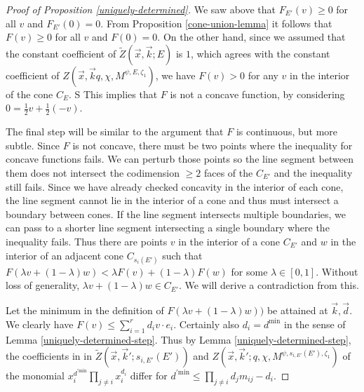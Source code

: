 \documentclass[11pt,letterpaper]{article}
\theoremstyle{definition}
\theoremstyle{remark}
\numberwithin{equation}{section}
\theoremstyle{dotless}
\newcommand{\hchi}{\psi} %
\newcommand{\gene}{\zeta_1} %
\renewcommand{\tilde}{\widetilde}
\begin{document}
\begin{proof}[Proof of Proposition \ref{uniquely-determined}]

We saw above that $F_{E'}(v)\geq 0$ for all $v$ and $F_{E'}(0)=0$.  From Proposition \ref{cone-union-lemma} it follows that $F(v) \geq 0$ for all $v$ and $F(0)=0$. On the other hand, since we assumed that the constant coefficient of $\tilde{Z} (\vec{x},\vec{k}; E)$ is $1$, which agrees with the constant coefficient of  $Z(\vec{x}, \vec{k} q, \chi, M^{\hchi,E,\gene}) $, we have $F(v)>0$ for any $v$ in the interior of the cone $C_{E}$. S This implies that $F$ is not a concave function, by considering $0 = \frac{1}{2} v+ \frac{1}{2} (-v)$. 

The final step will be similar to the argument that $F$ is continuous, but more subtle. Since $F$ is not concave, there must be two points where the inequality for concave functions fails. We can perturb those points so the line segment between them does not intersect the codimension $\geq 2$ faces of the $C_{E'}$ and the inequality still fails. Since we have already checked concavity in the interior of each cone, the line segment cannot lie in the interior of a cone and thus must intersect a boundary between cones. If the line segment intersects multiple boundaries, we can pass to a shorter line segment intersecting a single boundary where the inequality fails. Thus there are points $v$ in the interior of a cone $C_{E'}$ and $w$ in the interior of an adjacent cone $C_{s_i(E')}$ such that $F( \lambda v + (1-\lambda ) w) < \lambda F(v) + (1-\lambda) F(w)$ for some $\lambda \in [0,1]$. Without loss of generality, $\lambda v + (1-\lambda) w \in C_{E'}$. We will derive a contradiction from this.

Let the minimum in the definition of $F(\lambda v + (1-\lambda) w) )$ be attained at $\vec{k}, \vec{d}$. We clearly have $F(v) \leq \sum_{i=1}^r d_i  v \cdot e_i$. Certainly also $d_i = d^{\mathrm{min}}$ in the sense of Lemma \ref{uniquely-determined-step}. Thus by Lemma \ref{uniquely-determined-step}, the coefficients in in $\tilde{Z} (\vec{x},\vec{k}'; s_{i,E'}(E'))$ and $Z(\vec{x}, \vec{k}' ;q, \chi, M^{\hchi, s_{i,E'}(E'),\gene}) $ of the monomial $x_i^{ d^{'\mathrm{min}}} \prod_{j \neq i} x_i^{d_i}$ differ for $d^{'\mathrm{min}} \leq \prod_{j\neq i} d_{j} m_{ij} -d_i$. 


\end{proof}
\end{document}
